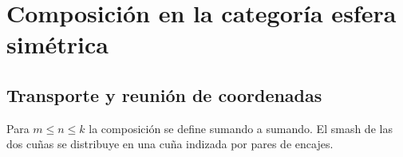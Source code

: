 \section{Composición en la categoría esfera simétrica}

\subsection{Transporte y reunión de coordenadas}

Para $m\leq n\leq k$ la composición se define sumando a sumando. El smash de las dos cuñas se distribuye en una cuña indizada por pares de encajes.

